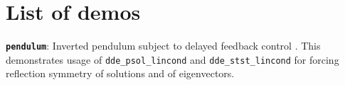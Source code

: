 \documentclass[11pt]{scrartcl}
\newcommand{\blist}[1]{\mbox{\lstinline!#1!}}  \newlength{\tabw}
\begin{document}
\section{List of demos}\label{sec:demos}
\begin{compactitem}
\item \textbf{\texttt{pendulum}}: Inverted pendulum subject to delayed
  feedback control \cite{SK04}. This demonstrates usage of
  \blist{dde_psol_lincond} and \blist{dde_stst_lincond} for forcing
  reflection symmetry of solutions and of eigenvectors.
\end{compactitem}

{\small 
}
\end{document}
